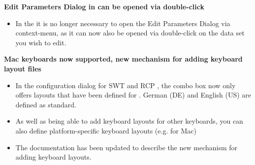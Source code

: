 \textbf{Edit Parameters Dialog in \gddataeditor{} can be opened via double-click}
\begin{itemize}
\item In the \gddataeditor{}  it is no longer necessary to open the Edit Parameters Dialog via context-menu, as it can now also be opened via double-click on the data set you wish to edit.
\end{itemize}


\textbf{Mac keyboards now supported, new mechanism for adding keyboard layout files}
\begin{itemize}
\item In the \gdaut{} configuration dialog for SWT and RCP \gdauts{}, the  combo box now only offers 
layouts that have been defined for \app{}. German (DE) and English (US) are defined as standard. 
\item As well as being able to add keyboard layouts for other keyboards, you can also define platform-specific keyboard layouts (e.g. for Mac)
\item The documentation has been updated to describe the new mechanism for adding keyboard layouts.
\end{itemize}
